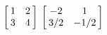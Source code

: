 {$\left[\hskip -3pt \begin{array}{cc} 1&2\\  3&4\end {array} \hskip -3pt
 \right] $
 }
{$\left[\hskip -3pt \begin{array}{cc} -2&1\\  3/2&-1/2\end {array} \hskip -3pt
 \right] $}
